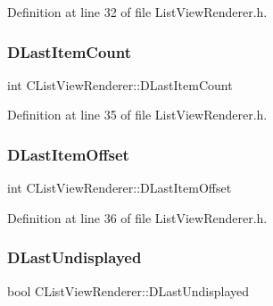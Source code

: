Definition at line 32 of file List\+View\+Renderer.\+h.

\hypertarget{classCListViewRenderer_a087155c29c7ac3a830f6645af590ed94}{}\label{classCListViewRenderer_a087155c29c7ac3a830f6645af590ed94} 
\subsubsection{\texorpdfstring{D\+Last\+Item\+Count}{DLastItemCount}}
{\footnotesize\ttfamily int C\+List\+View\+Renderer\+::\+D\+Last\+Item\+Count\hspace{0.3cm}{\ttfamily [protected]}}



Definition at line 35 of file List\+View\+Renderer.\+h.

\hypertarget{classCListViewRenderer_ad6b2b0052b8f74e3198fbfb39900b4e3}{}\label{classCListViewRenderer_ad6b2b0052b8f74e3198fbfb39900b4e3} 
\subsubsection{\texorpdfstring{D\+Last\+Item\+Offset}{DLastItemOffset}}
{\footnotesize\ttfamily int C\+List\+View\+Renderer\+::\+D\+Last\+Item\+Offset\hspace{0.3cm}{\ttfamily [protected]}}



Definition at line 36 of file List\+View\+Renderer.\+h.

\hypertarget{classCListViewRenderer_ad08a63dfe697395050c5af2ce4479aa2}{}\label{classCListViewRenderer_ad08a63dfe697395050c5af2ce4479aa2} 
\subsubsection{\texorpdfstring{D\+Last\+Undisplayed}{DLastUndisplayed}}
{\footnotesize\ttfamily bool C\+List\+View\+Renderer\+::\+D\+Last\+Undisplayed\hspace{0.3cm}{\ttfamily [protected]}}




